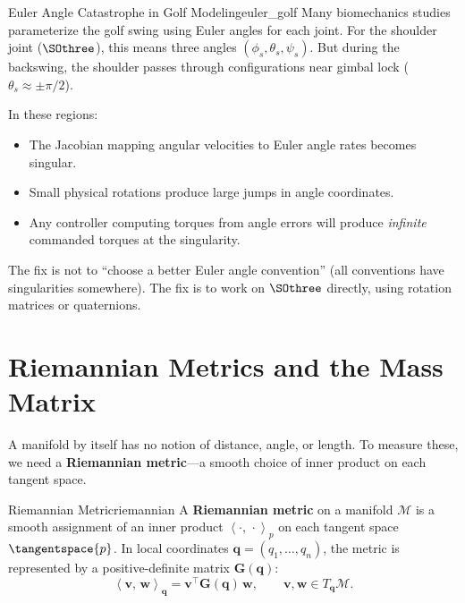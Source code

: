 \documentclass[12pt, openany]{book}
\theoremstyle{plain}
\newcommand{\manifold}{\mathcal{M}}
\newcommand{\inner}[2]{\left\langle #1,\, #2 \right\rangle}
\begin{document}
\begin{warning}{Euler Angle Catastrophe in Golf Modeling}{euler_golf}
  Many biomechanics studies parameterize the golf swing using Euler angles for
  each joint. For the shoulder joint ($\SOthree$), this means three angles
  $(\phi_s, \theta_s, \psi_s)$. But during the backswing, the shoulder
  passes through configurations near gimbal lock ($\theta_s \approx \pm\pi/2$).

  In these regions:
  \begin{itemize}[leftmargin=1cm]
    \item The Jacobian mapping angular velocities to Euler angle rates becomes
      singular.
    \item Small physical rotations produce large jumps in angle coordinates.
    \item Any controller computing torques from angle errors will produce
      \emph{infinite} commanded torques at the singularity.
  \end{itemize}
  The fix is not to ``choose a better Euler angle convention'' (all conventions
  have singularities somewhere). The fix is to work on $\SOthree$ directly,
  using rotation matrices or quaternions.
\end{warning}

\section{Riemannian Metrics and the Mass Matrix}

A manifold by itself has no notion of distance, angle, or length. To measure
these, we need a \textbf{Riemannian metric}---a smooth choice of inner product
on each tangent space.

\begin{definition}{Riemannian Metric}{riemannian}
  A \textbf{Riemannian metric} on a manifold $\manifold$ is a smooth assignment
  of an inner product $\inner{\cdot}{\cdot}_p$ on each tangent space
  $\tangentspace{p}$. In local coordinates $\bm{q} = (q_1, \ldots, q_n)$, the
  metric is represented by a positive-definite matrix $\bm{G}(\bm{q})$:
  \begin{equation}
    \inner{\bm{v}}{\bm{w}}_{\bm{q}} = \bm{v}^\top \bm{G}(\bm{q})\, \bm{w},
    \qquad \bm{v}, \bm{w} \in T_{\bm{q}}\manifold.
  \end{equation}
\end{definition}
\end{document}
